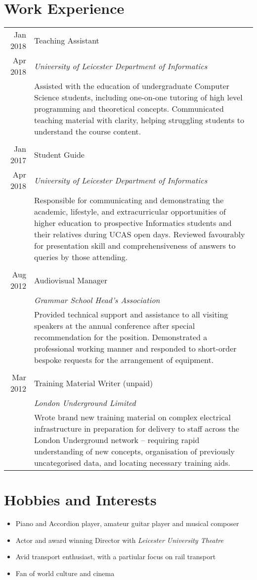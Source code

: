 \documentclass[a4paper]{article}
\begin{document}
\section*{Work Experience}
\begin{tabular}{r|p{11.75cm}}
  Jan 2018 & Teaching Assistant \\
  Apr 2018 & \emph{University of Leicester Department of Informatics} \\
  & Assisted with the education of undergraduate Computer Science students, including one-on-one tutoring of high level programming and theoretical concepts. Communicated teaching material with clarity, helping struggling students to understand the course content. \\
  \multicolumn{2}{c}{} \\
  
  Jan 2017 & Student Guide \\
  Apr 2018 & \emph{University of Leicester Department of Informatics} \\
  & Responsible for communicating and demonstrating the academic, lifestyle, and extracurricular opportunities of higher education to prospective Informatics students and their relatives during UCAS open days. Reviewed favourably for presentation skill and comprehensiveness of answers to queries by those attending. \\
  \multicolumn{2}{c}{} \\

  Aug 2012 & Audiovisual Manager \\
  & \emph{Grammar School Head's Association} \\
  & Provided technical support and assistance to all visiting speakers at the annual conference after special recommendation for the position. Demonstrated a professional working manner and responded to short-order bespoke requests for the arrangement of equipment. \\
  \multicolumn{2}{c}{} \\

  Mar 2012 & Training Material Writer (unpaid) \\
  & \emph{London Underground Limited} \\
  & Wrote brand new training material on complex electrical infrastructure in preparation for delivery to staff across the London Underground network -- requiring rapid understanding of new concepts, organisation of previously uncategorised data, and locating necessary training aids.
\end{tabular}

\section*{Hobbies and Interests}
\begin{itemize}
\item Piano and Accordion player, amateur guitar player and musical composer
\item Actor and award winning Director with \emph{Leicester University Theatre}
\item Avid transport enthusiast, with a partiular focus on rail transport
\item Fan of world culture and cinema
\end{itemize}
\end{document}
